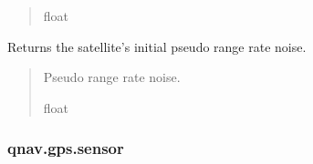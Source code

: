 \documentclass[letterpaper,10pt,english]{sphinxmanual}
\begin{document}
\begin{fulllineitems}
\begin{fulllineitems}
\begin{quote}
\begin{description}
\sphinxAtStartPar
float

\end{description}\end{quote}

\end{fulllineitems}


\begin{fulllineitems}
\label{\detokenize{modules/gps/satellite:qnav.gps.satellite.Satellite.pseudo_range_rate_noise}}
\pysigstartsignatures
{}
\pysigstopsignatures
\sphinxAtStartPar
Returns the satellite’s initial pseudo range rate noise.
\begin{quote}\begin{description}
\sphinxAtStartPar
Pseudo range rate noise.

\sphinxAtStartPar
float

\end{description}\end{quote}

\end{fulllineitems}


\end{fulllineitems}


\sphinxstepscope


\subsubsection{qnav.gps.sensor}
\label{\detokenize{modules/gps/sensor:module-qnav.gps.sensor}}\label{\detokenize{modules/gps/sensor:qnav-gps-sensor}}\label{\detokenize{modules/gps/sensor::doc}}
\end{document}
